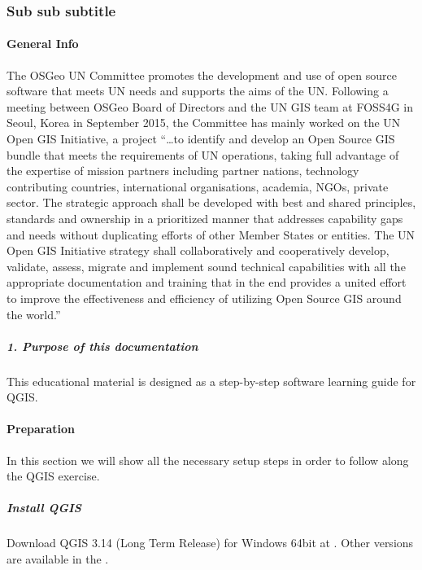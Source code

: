 \documentclass[letterpaper,10pt,english]{sphinxmanual}
\begin{document}
\subsubsection{Sub sub subtitle}
\label{\detokenize{index:sub-sub-subtitle}}

\paragraph{General Info}
\label{\detokenize{introduction/general:general-info}}\label{\detokenize{introduction/general::doc}}
The OSGeo UN Committee promotes the development and use of open source software that meets UN needs and supports the aims of the UN. Following a meeting between OSGeo Board of Directors and the UN GIS team at FOSS4G in Seoul, Korea in September 2015, the Committee has mainly worked on the UN Open GIS Initiative, a project “…to identify and develop an Open Source GIS bundle that meets the requirements of UN operations, taking full advantage of the expertise of mission partners including partner nations, technology contributing countries, international organisations, academia, NGOs, private sector. The strategic approach shall be developed with best and shared principles, standards and ownership in a prioritized manner that addresses capability gaps and needs without duplicating efforts of other Member States or entities. The UN Open GIS Initiative strategy shall collaboratively and cooperatively develop, validate, assess, migrate and implement sound technical capabilities with all the appropriate documentation and training that in the end provides a united effort to improve the effectiveness and efficiency of utilizing Open Source GIS around the world.”


\subparagraph{1. Purpose of this documentation}
\label{\detokenize{introduction/general:purpose-of-this-documentation}}
This educational material is designed as a step-by-step software learning guide for QGIS.


\paragraph{Preparation}
\label{\detokenize{preparation/preparation:preparation}}\label{\detokenize{preparation/preparation::doc}}
In this section we will show all the necessary setup steps in order to follow along the QGIS exercise.


\subparagraph{Install QGIS}
\label{\detokenize{preparation/preparation:install-qgis}}
Download QGIS 3.14 (Long Term Release) for Windows 64bit at .
Other versions are available in the .
\end{document}
